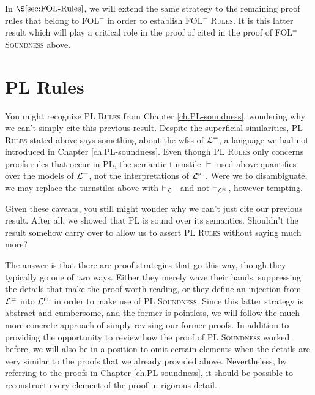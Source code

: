 In $\S\ref{sec:FOL-Rules}$, we will extend the same strategy to the remaining proof rules that belong to FOL$^=$ in order to establish \textsc{FOL$^=$ Rules}.
It is this latter result which will play a critical role in the proof of  cited in the proof of \textsc{FOL$^=$ Soundness} above.





\section{PL Rules}%
  \label{sec:PL-Rules}

You might recognize \textsc{PL Rules} from Chapter \ref{ch.PL-soundness}, wondering why we can't simply cite this previous result.
Despite the superficial similarities, \textsc{PL Rules} stated above says something about the wfss of $\mathcal{L}^{=}$, a language we had not introduced in Chapter \ref{ch.PL-soundness}.
Even though \textsc{PL Rules} only concerns proofs rules that occur in PL, the semantic turnstile $\vDash$ used above quantifies over the models of $\mathcal{L}^{=}$, not the interpretations of $\mathcal{L}^{\textsc{pl}}$. 
Were we to disambiguate, we may replace the turnstiles above with $\vDash_{\mathcal{L}^{=}}$ and not $\vDash_{\mathcal{L}^{\textsc{pl}}}$, however tempting. 

Given these caveats, you still might wonder why we can't just cite our previous result. 
After all, we showed that PL is sound over its semantics.
Shouldn't the result somehow carry over to allow us to assert \textsc{PL Rules} without saying much more?

The answer is that there are proof strategies that go this way, though they typically go one of two ways.
Either they merely wave their hands, suppressing the details that make the proof worth reading, or they define an injection from $\mathcal{L}^{=}$ into $\mathcal{L}^{\textsc{pl}}$ in order to make use of \textsc{PL Soundness}. %
Since this latter strategy is abstract and cumbersome, and the former is pointless, we will follow the much more concrete approach of simply revising our former proofs.
In addition to providing the opportunity to review how the proof of \textsc{PL Soundness} worked before, we will also be in a position to omit certain elements when the details are very similar to the proofs that we already provided above.
Nevertheless, by referring to the proofs in Chapter \ref{ch.PL-soundness}, it should be possible to reconstruct every element of the proof in rigorous detail.




